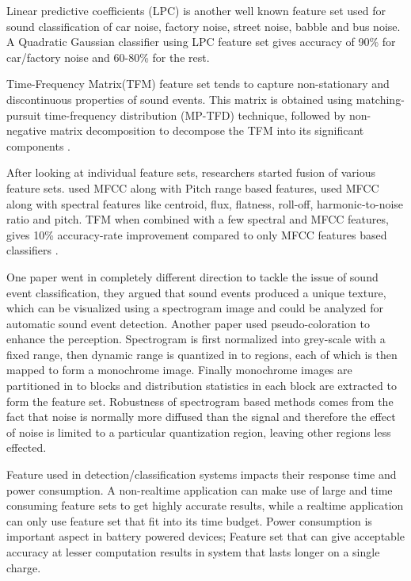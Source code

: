 Linear predictive coefficients (LPC) is another well known feature set used for sound
classification of car noise, factory noise, street noise, babble and bus noise. A Quadratic
Gaussian classifier using LPC feature set gives accuracy of 90\% for car/factory noise
and 60-80\% for the rest.

Time-Frequency Matrix(TFM) feature set tends to capture non-stationary and discontinuous properties of sound events. This matrix is obtained using matching-pursuit time-frequency distribution (MP-TFD) technique, followed by non-negative matrix decomposition to decompose the TFM into its significant components \cite{paper9}.

After looking at individual feature sets, researchers started fusion of various feature sets. \cite{paper6} used MFCC along with Pitch range based features, \cite{paper10} used MFCC along with spectral features like centroid, flux, flatness, roll-off, harmonic-to-noise ratio and pitch. TFM when combined with a few spectral and MFCC features, gives 10\% accuracy-rate improvement compared to only MFCC features based classifiers \cite{paper9}.

One paper \cite{paper11} went in completely different direction to tackle the issue of sound event classification, they argued that sound events produced a unique texture, which can be visualized using a spectrogram image and could be analyzed for automatic sound event detection. Another paper \cite{paper12} used pseudo-coloration to enhance the perception. Spectrogram is first normalized into grey-scale with a fixed range, then dynamic range is quantized in to regions, each of which is then mapped to form a monochrome image. Finally monochrome images are partitioned in to blocks and distribution statistics in each block are extracted to form the feature set. Robustness of spectrogram based methods comes from the fact that noise
is normally more diffused than the signal and therefore the effect of noise is limited to a
particular quantization region, leaving other regions less effected.

Feature used in detection/classification systems impacts their response time and power
consumption. A non-realtime application can make use of large and time consuming feature sets to get highly accurate results, while a realtime application can only use feature
set that fit into its time budget. Power consumption is important aspect in battery powered devices; Feature set that can give acceptable accuracy at lesser computation results in system that lasts longer on a single charge.

